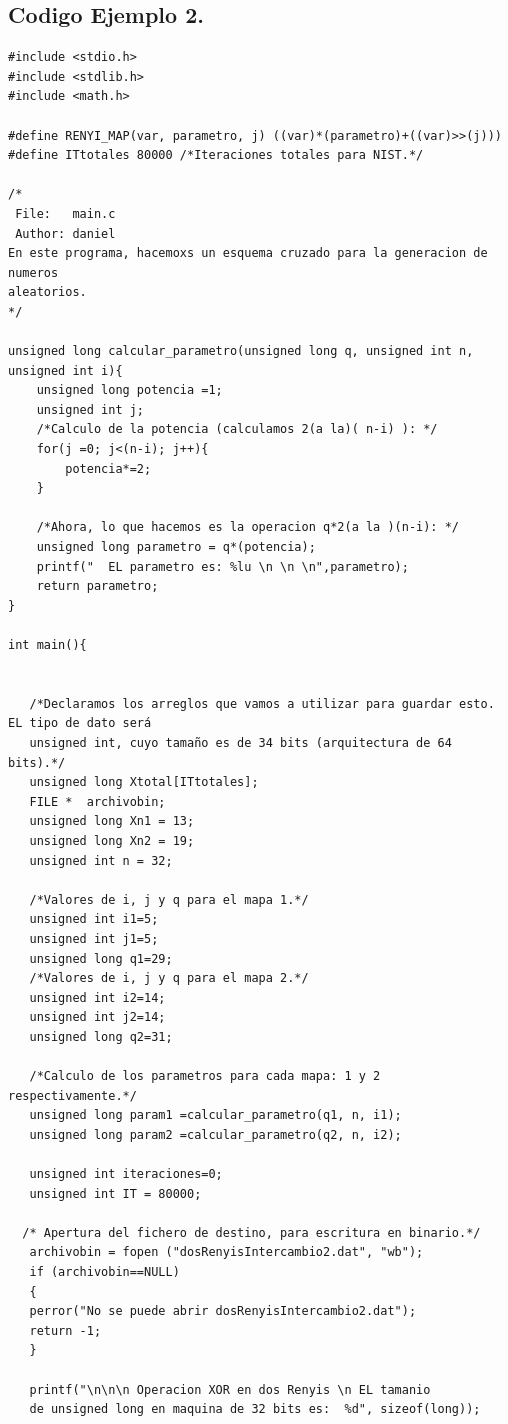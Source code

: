\documentclass[10pt]{IEEEtran}
\begin{document}
\subsection{Codigo Ejemplo 2.}
\begin{verbatim}
#include <stdio.h>
#include <stdlib.h>
#include <math.h>

#define RENYI_MAP(var, parametro, j) ((var)*(parametro)+((var)>>(j)))
#define ITtotales 80000 /*Iteraciones totales para NIST.*/

/*
 File:   main.c
 Author: daniel
En este programa, hacemoxs un esquema cruzado para la generacion de numeros
aleatorios.
*/

unsigned long calcular_parametro(unsigned long q, unsigned int n, unsigned int i){    
    unsigned long potencia =1;
    unsigned int j;
    /*Calculo de la potencia (calculamos 2(a la)( n-i) ): */
    for(j =0; j<(n-i); j++){
        potencia*=2;
    }

    /*Ahora, lo que hacemos es la operacion q*2(a la )(n-i): */
    unsigned long parametro = q*(potencia);
    printf("  EL parametro es: %lu \n \n \n",parametro);
    return parametro;
}

int main(){
 
   
   /*Declaramos los arreglos que vamos a utilizar para guardar esto. EL tipo de dato será
   unsigned int, cuyo tamaño es de 34 bits (arquitectura de 64 bits).*/
   unsigned long Xtotal[ITtotales]; 
   FILE *  archivobin; 
   unsigned long Xn1 = 13;
   unsigned long Xn2 = 19;
   unsigned int n = 32;

   /*Valores de i, j y q para el mapa 1.*/
   unsigned int i1=5; 
   unsigned int j1=5; 
   unsigned long q1=29;
   /*Valores de i, j y q para el mapa 2.*/
   unsigned int i2=14; 
   unsigned int j2=14; 
   unsigned long q2=31;
 
   /*Calculo de los parametros para cada mapa: 1 y 2 respectivamente.*/
   unsigned long param1 =calcular_parametro(q1, n, i1);
   unsigned long param2 =calcular_parametro(q2, n, i2);
 
   unsigned int iteraciones=0;
   unsigned int IT = 80000;

  /* Apertura del fichero de destino, para escritura en binario.*/
   archivobin = fopen ("dosRenyisIntercambio2.dat", "wb");
   if (archivobin==NULL)
   {
   perror("No se puede abrir dosRenyisIntercambio2.dat");
   return -1;
   }
   
   printf("\n\n\n Operacion XOR en dos Renyis \n EL tamanio 
   de unsigned long en maquina de 32 bits es:  %d", sizeof(long));


\end{verbatim}
\end{document}
